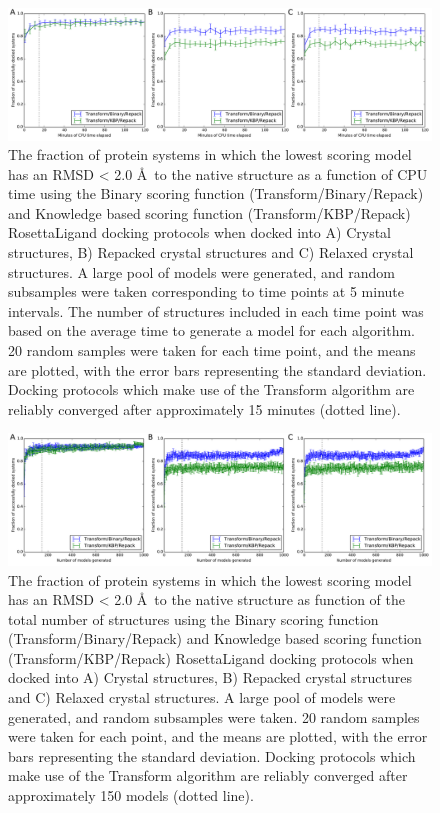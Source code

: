 \begin{figure}
\centering
\includegraphics[width=6in]{figures/lowres_appendix/fraction_successful_time_supplement.pdf}
\caption{
The fraction of protein systems in which the lowest scoring model has an \acs{RMSD} < 2.0 \AA\ to the native structure as a function of \acs{CPU} time using the Binary scoring function (Transform/Binary/Repack) and Knowledge based scoring function (Transform/\acs{KBP}/Repack) RosettaLigand docking protocols when docked into A) Crystal structures, B) Repacked crystal structures and C) Relaxed crystal structures. 
A large pool of models were generated, and random subsamples were taken corresponding to time points at 5 minute intervals.
The number of structures included in each time point was based on the average time to generate a model for each algorithm.
20 random samples were taken for each time point, and the means are plotted, with the error bars representing the standard deviation. Docking protocols which make use of the Transform algorithm are reliably converged after approximately 15 minutes (dotted line).  
}
\label{fig:frac_time}
\end{figure}

\begin{figure}
\centering
\includegraphics[width=6in]{figures/lowres_appendix/fraction_successful_count_supplement.pdf}
\caption{
The fraction of protein systems in which the lowest scoring model has an \acs{RMSD} < 2.0 \AA\ to the native structure as function of the total number of structures using the Binary scoring function (Transform/Binary/Repack) and Knowledge based scoring function (Transform/\acs{KBP}/Repack) RosettaLigand docking protocols when docked into A) Crystal structures, B) Repacked crystal structures and C) Relaxed crystal structures.
A large pool of models were generated, and random subsamples were taken.
20 random samples were taken for each point, and the means are plotted, with the error bars representing the standard deviation.
Docking protocols which make use of the Transform algorithm are reliably converged after approximately 150 models (dotted line).
}
\label{fig:frac_count}
\end{figure}

